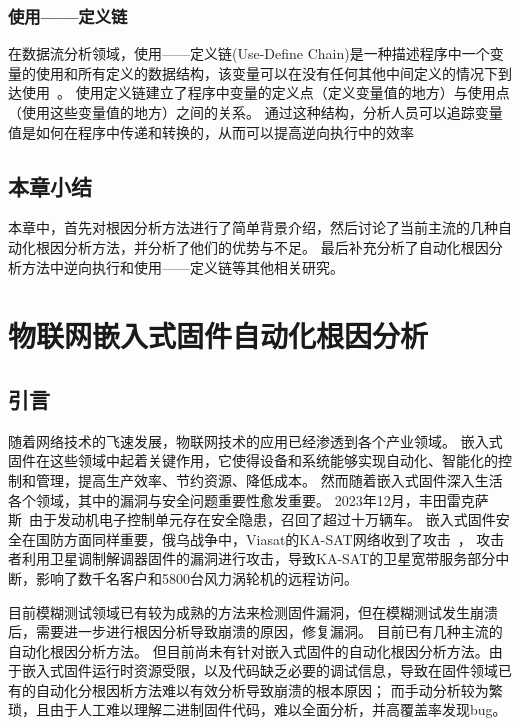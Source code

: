 \subsubsection{使用——定义链}
在数据流分析领域，使用——定义链(Use-Define Chain)是一种描述程序中一个变量的使用和所有定义的数据结构，该变量可以在没有任何其他中间定义的情况下到达使用~\cite{Compilers2007}。
使用定义链建立了程序中变量的定义点（定义变量值的地方）与使用点（使用这些变量值的地方）之间的关系。
通过这种结构，分析人员可以追踪变量值是如何在程序中传递和转换的，从而可以提高逆向执行中的效率

\subsection{本章小结}
本章中，首先对根因分析方法进行了简单背景介绍，然后讨论了当前主流的几种自动化根因分析方法，并分析了他们的优势与不足。
最后补充分析了自动化根因分析方法中逆向执行和使用——定义链等其他相关研究。


\cleardoublepage
\section{物联网嵌入式固件自动化根因分析}    %
\subsection{引言}                         %
随着网络技术的飞速发展，物联网技术的应用已经渗透到各个产业领域。
嵌入式固件在这些领域中起着关键作用，它使得设备和系统能够实现自动化、智能化的控制和管理，提高生产效率、节约资源、降低成本。
然而随着嵌入式固件深入生活各个领域，其中的漏洞与安全问题重要性愈发重要。
2023年12月，丰田雷克萨斯~\cite{toyota}由于发动机电子控制单元存在安全隐患，召回了超过十万辆车。
嵌入式固件安全在国防方面同样重要，俄乌战争中，Viasat的KA-SAT网络收到了攻击~\cite{KASAT}，
攻击者利用卫星调制解调器固件的漏洞进行攻击，导致KA-SAT的卫星宽带服务部分中断，影响了数千名客户和5800台风力涡轮机的远程访问。

目前模糊测试领域已有较为成熟的方法来检测固件漏洞，但在模糊测试发生崩溃后，需要进一步进行根因分析导致崩溃的原因，修复漏洞。
目前已有几种主流的自动化根因分析方法。
但目前尚未有针对嵌入式固件的自动化根因分析方法。由于嵌入式固件运行时资源受限，以及代码缺乏必要的调试信息，导致在固件领域已有的自动化分根因析方法难以有效分析导致崩溃的根本原因；
而手动分析较为繁琐，且由于人工难以理解二进制固件代码，难以全面分析，并高覆盖率发现bug。

